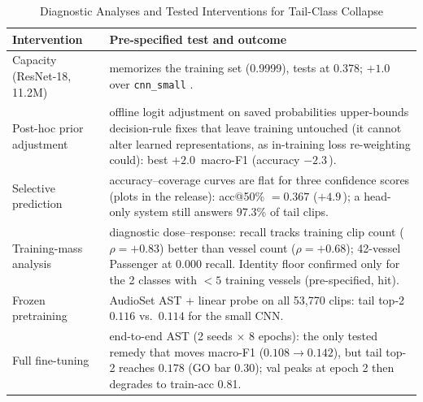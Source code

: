 ﻿\documentclass[journal]{IEEEtran}
\newcommand{\pp}{\,\text{pp}}
\begin{document}
\begin{table}[!t]
\caption{Diagnostic Analyses and Tested Interventions for Tail-Class Collapse}
\label{tab:interv}
\centering
\begin{tabular}{p{}p{}}
\toprule
Intervention & Pre-specified test and outcome \\
\midrule
Capacity (ResNet-18, 11.2M) & memorizes the training set (0.9999), tests at 0.378; $+1.0$\pp{}
over \texttt{cnn\_small} \cite{soti2026}. \\
\midrule
Post-hoc prior adjustment & offline logit adjustment on saved probabilities upper-bounds decision-rule
fixes that leave training untouched (it cannot alter learned representations, as in-training loss
re-weighting could): best $+2.0$\pp{} macro-F1 (accuracy $-2.3$\pp). \\
\midrule
Selective prediction & accuracy--coverage curves are flat for three confidence scores
(plots in the release): acc@50\%
$=0.367$ ($+4.9$\pp); a head-only system still answers 97.3\% of tail clips. \\
\midrule
Training-mass analysis & diagnostic dose--response: recall tracks training clip count ($\rho=+0.83$) better than
vessel count ($\rho=+0.68$); 42-vessel Passenger at 0.000 recall. Identity floor confirmed only for
the 2 classes with $<5$ training vessels (pre-specified, hit). \\
\midrule
Frozen pretraining & AudioSet AST \cite{gong2021ast} + linear probe on all 53{,}770 clips: tail
top-2 $0.116$ vs.\ $0.114$ for the small CNN. \\
\midrule
Full fine-tuning & end-to-end AST (2 seeds $\times$ 8 epochs): the only tested remedy that moves
macro-F1 ($0.108\to0.142$), but tail top-2 reaches $0.178$ (GO bar $0.30$); val peaks at epoch 2
then degrades to train-acc 0.81. \\
\bottomrule
\end{tabular}
\end{table}
\end{document}
